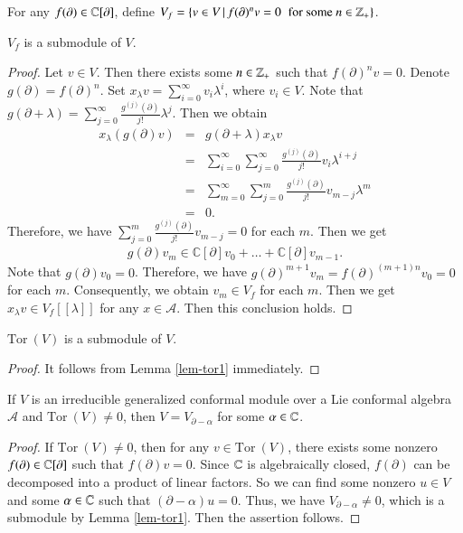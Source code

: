 \documentclass[12pt]{amsart}
\begin{document}
For any $f(\partial)\in\mathbb{C}[\partial]$, define $V_f=\{v\in V\,|\,f(\partial)^nv=0\;\;\text{for some $n\in\mathbb{Z}_+$}\}$.
\begin{lem}\label{lem-tor1}
$V_f$ is a submodule of $V$.
\end{lem}
\begin{proof}
Let $v\in V$. Then there exists some $ n\in\mathbb{Z}_+$ such that $f(\partial)^nv=0$. Denote $g(\partial)=f(\partial)^n$. Set $x_\lambda v=\sum_{i=0}^\infty v_i\lambda^i$, where $v_i\in V$. Note that $g(\partial+\lambda)=\sum_{j=0}^\infty \frac{g^{(j)}(\partial)}{j!}\lambda^j$. Then we obtain
\begin{eqnarray*}
x_\lambda (g(\partial)v)&=&g(\partial+\lambda)x_\lambda v\\
&=&\sum_{i=0}^\infty\sum_{j=0}^\infty\frac{g^{(j)}(\partial)}{j!}v_i\lambda^{i+j}\\
&=&\sum_{m=0}^\infty\sum_{j=0}^m\frac{g^{(j)}(\partial)}{j!}v_{m-j}\lambda^{m}\\
&=& 0.
\end{eqnarray*}
Therefore, we have $\sum_{j=0}^m\frac{g^{(j)}(\partial)}{j!}v_{m-j}=0$ for each $m$. Then we get
\begin{eqnarray*}
g(\partial)v_m\in \mathbb{C}[\partial]v_0+\ldots+\mathbb{C}[\partial]v_{m-1}.
\end{eqnarray*}
Note that $g(\partial)v_0=0$. Therefore, we have $g(\partial)^{m+1}v_m=f(\partial)^{(m+1)n}v_0=0$ for each $m$. Consequently, we obtain $v_m\in V_f$ for each $m$. Then we get
$x_\lambda v\in V_f[[\lambda]]$ for any $x\in \mathcal{A}$. Then this conclusion holds.
\end{proof}
\begin{cor}
$\text{Tor}~(V)$ is a submodule of $V$.
\end{cor}
\begin{proof}It follows from Lemma \ref{lem-tor1} immediately.
\end{proof}
\begin{lem}\label{lem-tor2}If $V$ is an irreducible generalized conformal module over a Lie conformal algebra $\mathcal{A}$ and $\text{Tor}~(V)\neq 0$, then
$V=V_{\partial-\alpha}$ for some $\alpha\in\mathbb{C}$.
\end{lem}
\begin{proof}
If $\text{Tor}~(V)\neq 0$, then for any $v\in \text{Tor}~(V)$, there exists some nonzero $f(\partial)\in \mathbb{C}[\partial]$ such that $f(\partial)v=0$.
Since $\mathbb{C}$ is algebraically closed, $f(\partial)$ can be decomposed into a product of linear factors. So we can find some nonzero $u\in V$ and some
$\alpha\in\mathbb{C}$ such that $(\partial-\alpha)u=0$.
Thus, we have $V_{\partial-\alpha}\neq 0$, which is a submodule by Lemma \ref{lem-tor1}. Then the assertion follows.
\end{proof}
\end{document}
